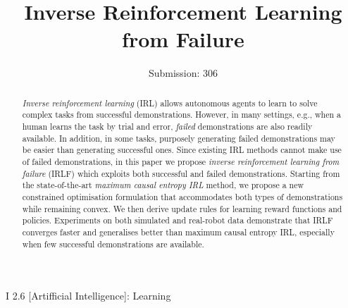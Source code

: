 \documentclass{aamas2016}
\begin{document}
%
\title{Inverse Reinforcement Learning from Failure}
\author{Submission: 306}
\maketitle
\begin{abstract}

\emph{Inverse reinforcement learning} (IRL) allows autonomous agents to learn to solve complex tasks from successful demonstrations.  However, in many settings, e.g., when a human learns the task by trial and error, \emph{failed} demonstrations are also readily available.  In addition, in some tasks, purposely generating failed demonstrations may be easier than generating successful ones.  Since existing IRL methods cannot make use of failed demonstrations, in this paper we propose \emph{inverse reinforcement learning from failure} (IRLF) which exploits both successful and failed demonstrations.  Starting from the state-of-the-art \emph{maximum causal entropy IRL} method, we propose a new constrained optimisation formulation that accommodates both types of demonstrations while remaining convex.  We then derive update rules for learning reward functions and policies. Experiments on both simulated and real-robot data demonstrate that IRLF converges faster and generalises better than maximum causal entropy IRL, especially when few successful demonstrations are available.
\end{abstract}

\category I 2.6  [Artifficial Intelligence]: Learning



\end{document}
